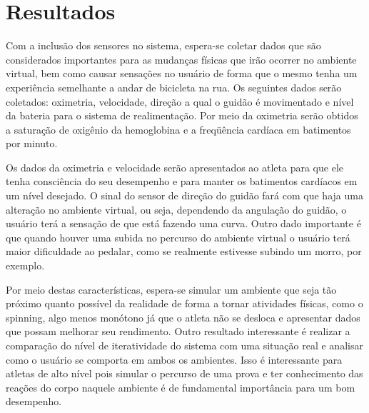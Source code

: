 \chapter[Resultados]{Resultados}

Com a inclusão dos sensores no sistema, espera-se coletar dados que são considerados importantes para as mudanças físicas que irão ocorrer no ambiente virtual, bem como causar sensações no usuário de forma que o mesmo tenha um experiência semelhante a andar de bicicleta na rua. Os seguintes dados serão coletados: oximetria, velocidade, direção a qual o guidão é movimentado e nível da bateria para o sistema de realimentação. Por meio da oximetria serão obtidos a saturação de oxigênio da hemoglobina e a freqüência cardíaca em batimentos por minuto.

Os dados da oximetria e velocidade serão apresentados ao atleta para que ele tenha consciência do seu desempenho e para manter os batimentos cardíacos em um nível desejado. O sinal do sensor de direção do guidão fará com que haja uma alteração no ambiente virtual, ou seja, dependendo da angulação do guidão, o usuário terá a sensação de que está fazendo uma curva. Outro dado importante é que quando houver uma subida no percurso do ambiente virtual o usuário terá maior dificuldade ao pedalar, como se realmente estivesse subindo um morro, por exemplo.

Por meio destas características, espera-se simular um ambiente que seja tão próximo quanto possível da realidade de forma a tornar atividades físicas, como o spinning, algo menos monótono já que o atleta não se desloca e apresentar dados que possam melhorar seu rendimento. Outro resultado interessante é realizar a comparação do nível de iteratividade do sistema com uma situação real e analisar como o usuário se comporta em ambos os ambientes. Isso é interessante para atletas de alto nível pois simular o percurso de uma prova e ter conhecimento das reações do corpo naquele ambiente é de fundamental importância para um bom desempenho.

